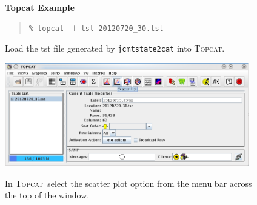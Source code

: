 \documentclass[twoside,11pt]{article}
\newcommand{\htmladdnormallink}[2]{#1}
\newenvironment{latexonly}{}{}
\renewcommand{\_}{\texttt{\symbol{95}}}
\newenvironment{fmpage}[1]{\begin{lrbox}{\fmbox}\begin{minipage}{#1}}{\end{minipage}\end{lrbox}\fbox{\usebox{\fmbox}}}
\newenvironment{myquote}{\begin{quote}\begin{small}}{\end{small}\end{quote}}
\newcommand{\topcat}{\htmladdnormallink{\textsc{Topcat}}{http://www.starlink.ac.uk/topcat}}
\begin{document}
\begin{latexonly}
\begin{figure}[ht!]
\begin{center}
\begin{fmpage}{0.95\linewidth}
\vspace{0.2cm}
\textbf{Topcat Example}

\vspace{0.5cm}

\begin{minipage}[c]{0.6\linewidth}

\begin{myquote}
\begin{verbatim}
% topcat -f tst 20120720_30.tst
\end{verbatim}
\end{myquote}
\end{minipage}
\hspace{0.3cm}
\begin{minipage}[c]{0.32\linewidth}
Load the tst file generated by \texttt{jcmtstate2cat} into \topcat.
\end{minipage}

\vspace{0.5cm}

\begin{minipage}[c]{0.6\linewidth}
\centering
\includegraphics[width=0.95\textwidth]{sc21_topcat1}

\end{minipage}
\hspace{0.3cm}
\begin{minipage}[c]{0.32\linewidth}
In \topcat\ select the scatter plot option
from the menu bar across the top of the window.
\end{minipage}

\vspace{0.5cm}


\end{fmpage}
\end{center}
\end{figure}
\end{latexonly}
\end{document}
